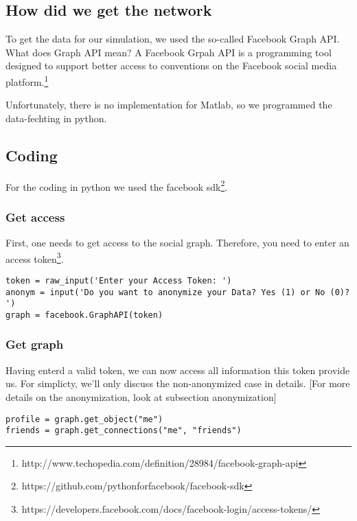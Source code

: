 
\subsection{How did we get the network} 

To get the data for our simulation, we used the so-called Facebook Graph API. What does Graph API mean? 
A Facebook Grpah API is a programming tool designed to support better access to conventions on the Facebook social media platform.\footnote{http://www.techopedia.com/definition/28984/facebook-graph-api} 

Unfortunately, there is no implementation for Matlab, so we programmed the data-fechting in python.

\subsection{Coding}

For the coding in python we used the facebook sdk\footnote{https://github.com/pythonforfacebook/facebook-sdk}. 

\subsubsection{Get access}

First, one needs to get access to the social graph. Therefore, you need to enter an access token\footnote{https://developers.facebook.com/docs/facebook-login/access-tokens/}. 

\begin{lstlisting} 
token = raw_input('Enter your Access Token: ')
anonym = input('Do you want to anonymize your Data? Yes (1) or No (0)? ')
graph = facebook.GraphAPI(token)

\end{lstlisting}

\subsubsection{Get graph}

Having enterd a valid token, we can now access all information this token provide us.  For simplicty, we'll only discuss  the non-anonymized case in details. [For more details on the anonymization, look at subsection anonymization]

\begin{lstlisting} 
profile = graph.get_object("me")
friends = graph.get_connections("me", "friends")
\end{lstlisting}

